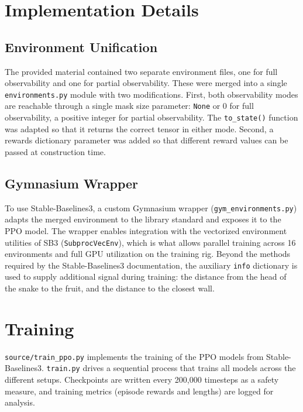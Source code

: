 \documentclass[10pt, conference, letterpaper]{IEEEtran}
\begin{document}
\section{Implementation Details}

\subsection{Environment Unification}

The provided material contained two separate environment files, one for full observability and one for partial observability. These were merged into a single \texttt{environments.py} module with two modifications. First, both observability modes are reachable through a single mask size parameter: \texttt{None} or 0 for full observability, a positive integer for partial observability. The \texttt{to\_state()} function was adapted so that it returns the correct tensor in either mode. Second, a rewards dictionary parameter was added so that different reward values can be passed at construction time.

\subsection{Gymnasium Wrapper}

To use Stable-Baselines3, a custom Gymnasium wrapper (\texttt{gym\_environments.py}) adapts the merged environment to the library standard and exposes it to the PPO model. The wrapper enables integration with the vectorized environment utilities of SB3 (\texttt{SubprocVecEnv}), which is what allows parallel training across 16 environments and full GPU utilization on the training rig. Beyond the methods required by the Stable-Baselines3 documentation, the auxiliary \texttt{info} dictionary is used to supply additional signal during training: the distance from the head of the snake to the fruit, and the distance to the closest wall.

\section{Training}

\texttt{source/train\_ppo.py} implements the training of the PPO models from Stable-Baselines3. \texttt{train.py} drives a sequential process that trains all models across the different setups. Checkpoints are written every 200,000 timesteps as a safety measure, and training metrics (episode rewards and lengths) are logged for analysis.
\end{document}
